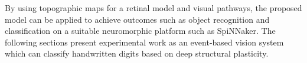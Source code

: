 \documentclass[sigconf]{acmart}
\begin{document}



By using topographic maps for a retinal model and visual pathways, the proposed model can be applied to achieve outcomes such as object recognition and classification on a suitable neuromorphic platform such as SpiNNaker.
The following sections present experimental work as an event-based vision system which can classify handwritten digits based on deep structural plasticity.
\end{document}
